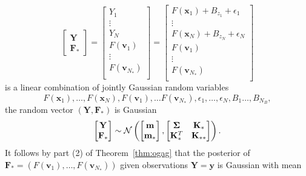 \begin{equation*}
    \begin{bmatrix}
        \mathbf{Y} \\
        \mathbf{F}_{*}
    \end{bmatrix}
    =
    \begin{bmatrix}
        Y_1 \\
        \vdots \\
        Y_N \\
        F(\mathbf{v}_1) \\
        \vdots \\
        F(\mathbf{v}_{N_{*}}) \\
    \end{bmatrix}
    =
    \begin{bmatrix}
        F(\mathbf{x}_1) + B_{z_1} + \epsilon_1 \\
        \vdots \\
        F(\mathbf{x}_N) + B_{z_N} + \epsilon_N \\
        F(\mathbf{v}_1) \\
        \vdots \\
        F(\mathbf{v}_{N_{*}}) \\
    \end{bmatrix}
\end{equation*}
is a linear combination of jointly Gaussian random variables
\begin{equation*}
    F(\mathbf{x}_1), \dots, F(\mathbf{x}_N), F(\mathbf{v}_1), \dots F(\mathbf{v}_{N_*}), \epsilon_1, \dots, \epsilon_N, B_1 \dots, B_{N_B},
\end{equation*}
the random vector $(\mathbf{Y}, \mathbf{F}_*)$ is Gaussian
\begin{equation*}
    \begin{bmatrix}
        \mathbf{Y} \\
        \mathbf{F}_*
    \end{bmatrix}
    \sim
    \mathcal{N}\left(
    \begin{bmatrix}
            \mathbf{m} \\
            \mathbf{m}_*
        \end{bmatrix}
    ,
    \begin{bmatrix}
            \boldsymbol{\Sigma} & \mathbf{K}_* \\
            \mathbf{K}_*^T & \mathbf{K}_{* *}
        \end{bmatrix}
    \right).
\end{equation*}
It follows by part (2) of Theorem~\ref{thm:ogag} that the posterior of $\mathbf{F}_* = (F(\mathbf{v}_1), \ldots, F(\mathbf{v}_{N_*}))$ given observations $\mathbf{Y} = \mathbf{y}$ is Gaussian with mean
